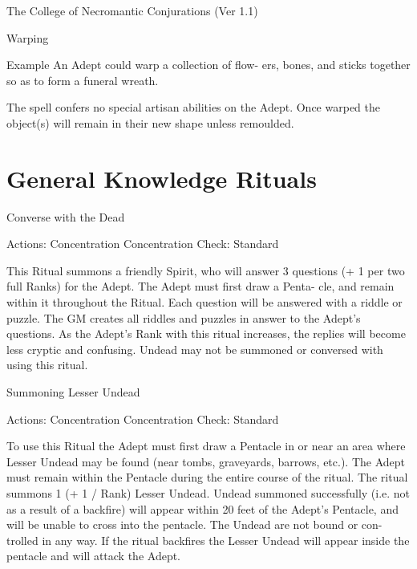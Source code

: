 \begin{Chapter}{The College of Necromantic Conjurations (Ver 1.1)}
\begin{spell}[G-11]{Warping }
\begin{effects}
Example 
An  Adept could warp a collection of  flow-
ers,  bones,  and  sticks  together  so  as  to  form  a  funeral 
wreath. 

The spell confers no special artisan abilities on the 
Adept.  Once  warped  the  object(s)  will  remain  in 
their new shape unless remoulded. 


\end{effects}
\end{spell}

\section{General Knowledge Rituals}

\begin{ritual}[Q-1]{Converse with the Dead }

Actions: Concentration 
Concentration Check: Standard 
\begin{effects}
This Ritual summons a friendly Spirit, who 
will  answer  3  questions  (+  1  per  two  full  Ranks) 
for the  Adept. The  Adept must first draw a Penta-
cle,  and  remain  within  it  throughout  the  Ritual. 
Each  question  will  be  answered  with  a  riddle  or 
puzzle.  The  GM  creates  all  riddles  and  puzzles  in 
answer  to  the  Adept’s  questions.  As  the  Adept’s 
Rank  with  this  ritual  increases,  the  replies  will 
become  less  cryptic  and  confusing.  Undead  may 
not  be  summoned  or  conversed  with  using  this 
ritual. 

\end{effects}
\end{ritual}

\begin{ritual}[Q-2]{Summoning Lesser Undead }

Actions: Concentration 
Concentration Check: Standard 
\begin{effects}
 To  use  this  Ritual  the  Adept  must  first 
draw  a  Pentacle  in  or  near  an  area  where  Lesser 
Undead  may  be  found  (near  tombs,  graveyards, 
barrows,  etc.).  The  Adept  must  remain  within  the 
Pentacle during the entire course of the ritual. The 
ritual  summons  1  (+  1  /  Rank)  Lesser  Undead. 
Undead summoned successfully (i.e. not as a result 
of  a  backfire)  will  appear  within  20  feet  of  the 
Adept’s  Pentacle,  and  will  be  unable  to  cross  into 
the  pentacle.  The  Undead  are  not  bound  or  con-
trolled in any way. If the ritual backfires the Lesser 
Undead  will  appear  inside  the  pentacle  and  will 
attack the Adept. 



\end{effects}
\end{ritual}
\end{Chapter}
